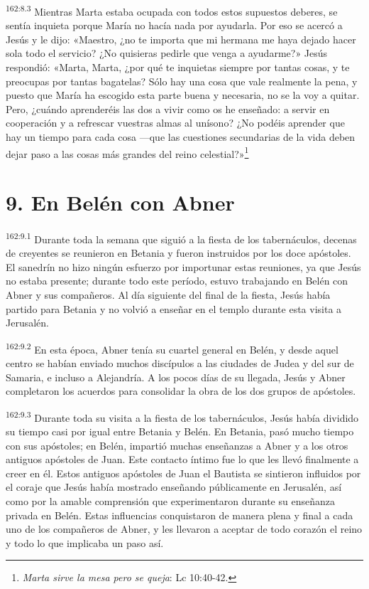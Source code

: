 \par 
\textsuperscript{162:8.3} Mientras Marta estaba ocupada con todos estos supuestos deberes, se sentía inquieta porque María no hacía nada por ayudarla. Por eso se acercó a Jesús y le dijo: «Maestro, ¿no te importa que mi hermana me haya dejado hacer sola todo el servicio? ¿No quisieras pedirle que venga a ayudarme?» Jesús respondió: «Marta, Marta, ¿por qué te inquietas siempre por tantas cosas, y te preocupas por tantas bagatelas? Sólo hay una cosa que vale realmente la pena, y puesto que María ha escogido esta parte buena y necesaria, no se la voy a quitar. Pero, ¿cuándo aprenderéis las dos a vivir como os he enseñado: a servir en cooperación y a refrescar vuestras almas al unísono? ¿No podéis aprender que hay un tiempo para cada cosa ---que las cuestiones secundarias de la vida deben dejar paso a las cosas más grandes del reino celestial?»\footnote{\textit{Marta sirve la mesa pero se queja}: Lc 10:40-42.}

\section*{9. En Belén con Abner}
\par 
\textsuperscript{162:9.1} Durante toda la semana que siguió a la fiesta de los tabernáculos, decenas de creyentes se reunieron en Betania y fueron instruidos por los doce apóstoles. El sanedrín no hizo ningún esfuerzo por importunar estas reuniones, ya que Jesús no estaba presente; durante todo este período, estuvo trabajando en Belén con Abner y sus compañeros. Al día siguiente del final de la fiesta, Jesús había partido para Betania y no volvió a enseñar en el templo durante esta visita a Jerusalén.

\par 
\textsuperscript{162:9.2} En esta época, Abner tenía su cuartel general en Belén, y desde aquel centro se habían enviado muchos discípulos a las ciudades de Judea y del sur de Samaria, e incluso a Alejandría. A los pocos días de su llegada, Jesús y Abner completaron los acuerdos para consolidar la obra de los dos grupos de apóstoles.

\par 
\textsuperscript{162:9.3} Durante toda su visita a la fiesta de los tabernáculos, Jesús había dividido su tiempo casi por igual entre Betania y Belén. En Betania, pasó mucho tiempo con sus apóstoles; en Belén, impartió muchas enseñanzas a Abner y a los otros antiguos apóstoles de Juan. Este contacto íntimo fue lo que les llevó finalmente a creer en él. Estos antiguos apóstoles de Juan el Bautista se sintieron influidos por el coraje que Jesús había mostrado enseñando públicamente en Jerusalén, así como por la amable comprensión que experimentaron durante su enseñanza privada en Belén. Estas influencias conquistaron de manera plena y final a cada uno de los compañeros de Abner, y les llevaron a aceptar de todo corazón el reino y todo lo que implicaba un paso así.

